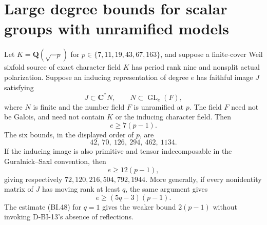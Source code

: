 \section{Large degree bounds for scalar groups with unramified models}
\label{sec:scalar-unramified}

\begin{theorem}
\label{D-BI-14}
Let $K=\mathbf Q(\sqrt{-p})$ for
$p\in\{7,11,19,43,67,163\}$, and suppose a finite-cover
Weil sixfold source of exact character field $K$ has period rank
nine and nonsplit actual polarization.  Suppose an inducing
representation of degree $e$ has faithful image $J$ satisfying
\[
                 J\subset\mathbf C^*N,
                 \qquad N\subset\operatorname{GL}_e(F),
                                                               \tag{BI.45}
\]
where $N$ is finite and the number field $F$ is unramified at $p$.
The field $F$ need not be Galois, and need not contain $K$ or the
inducing character field.  Then
\[
                  e\ge7(p-1).
                                                               \tag{BI.46}
\]
The six bounds, in the displayed order of $p$, are
\[
                   42,\ 70,\ 126,\ 294,\ 462,\ 1134.
\]
If the inducing image is also primitive and tensor indecomposable
in the Guralnick--Saxl convention, then
\[
                  e\ge12(p-1),
                                                               \tag{BI.47}
\]
giving respectively $72,120,216,504,792,1944$.
More generally, if every nonidentity matrix of $J$ has moving rank
at least $q$, the same argument gives
\[
                  e\ge(5q-3)(p-1).                         \tag{BI.48}
\]
The estimate (BI.48) for $q=1$ gives the weaker bound
$2(p-1)$ without invoking D-BI-13's absence of reflections.
\end{theorem}
